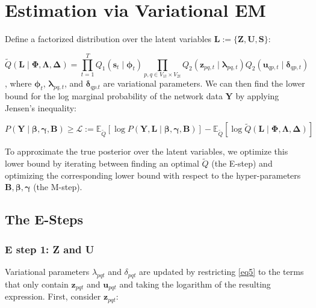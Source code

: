 \documentclass{article}
\begin{document}
\section{Estimation via Variational EM}
Define a factorized distribution over the latent variables $\mathbf{L} := \{\mathbf{Z}, \mathbf{U}, \mathbf{S}\}$:

\begin{equation}
    \tilde{Q}(\mathbf{L} \mid \boldsymbol{\Phi}, \boldsymbol{\Lambda}, \boldsymbol{\Delta}) = \prod_{t=1}^T Q_1(\mathbf{s}_t \mid \boldsymbol{\phi}_t) \prod_{p,q \in V_{1t} \times V_{2t}} Q_2(\mathbf{z}_{pq,t} \mid \boldsymbol{\lambda}_{pq,t}) Q_2(\mathbf{u}_{qp,t} \mid \boldsymbol{\delta}_{qp,t})
\end{equation}
, where $\boldsymbol{\phi}_t$, $\boldsymbol{\lambda}_{pq,t}$, and $\boldsymbol{\delta}_{qp.t}$ are variational parameters. We can then find the lower bound for the log marginal probability of the network data $\mathbf{Y}$ by applying Jensen's inequality:

\begin{equation}
    P(\mathbf{Y} \mid \boldsymbol{\beta}, \boldsymbol{\gamma}, \mathbf{B}) \geq \mathcal{L} := \mathbb{E}_{\widetilde{Q}}\left[ \log P \left( \mathbf{Y}, \mathbf{L} \mid \boldsymbol{\beta}, \boldsymbol{\gamma}, \mathbf{B} \right) \right] - \mathbb{E}_{\widetilde{Q}}\left[ \log \widetilde{Q}(\mathbf{L} \mid \boldsymbol{\Phi}, \boldsymbol{\Lambda}, \boldsymbol{\Delta}) \right]
\end{equation}

To approximate the true posterior over the latent variables, we optimize this lower bound by iterating between finding an optimal $\widetilde{Q}$ (the E-step) and optimizing the corresponding lower bound with respect to the hyper-parameters $\mathbf{B}, \boldsymbol{\beta}, \boldsymbol{\gamma}$ (the M-step).

\subsection{The E-Steps}

\subsubsection{E step 1: Z and U}

Variational parameters $\lambda_{pqt}$ and $\delta_{pqt}$ are updated by restricting \cref{eq5} to the terms that only contain $\mathbf{z}_{pqt}$ and $\mathbf{u}_{pqt}$ and taking the logarithm of the resulting expression. First, consider $\mathbf{z}_{pqt}$:
\end{document}
